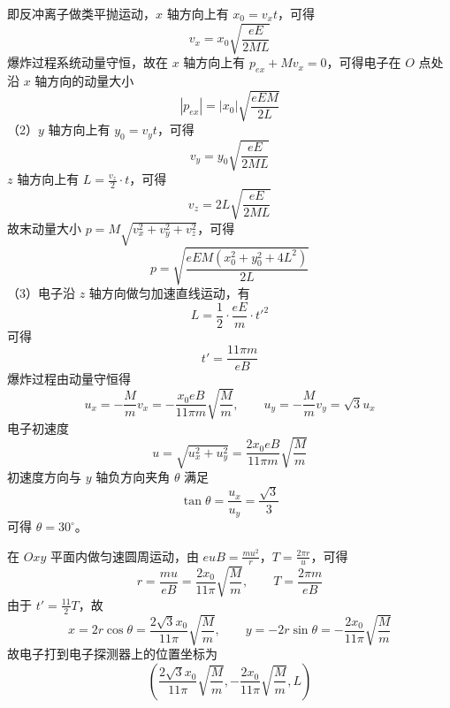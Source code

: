 \documentclass[\gkver]{gaokaozhenti}
\begin{document}
\begin{enumerate}
{即反冲离子做类平抛运动，$x$ 轴方向上有 $x_0=v_xt$，可得
\[
v_x=x_0\sqrt{\frac{eE}{2ML}}
\]
爆炸过程系统动量守恒，故在 $x$ 轴方向上有 $p_{ex}+Mv_x=0$，可得电子在 $O$ 点处沿 $x$ 轴方向的动量大小
\[
|p_{ex}|=|x_0|\sqrt{\frac{eEM}{2L}}
\]
（2）$y$ 轴方向上有 $y_0=v_yt$，可得
\[
v_y=y_0\sqrt{\frac{eE}{2ML}}
\]
$z$ 轴方向上有 $L=\frac{v_z}{2}\cdot t$，可得
\[
v_z=2L\sqrt{\frac{eE}{2ML}}
\]
故末动量大小 $p=M\sqrt{v_x^2+v_y^2+v_z^2}$，可得
\[
p=\sqrt{\frac{eEM(x_0^2+y_0^2+4L^2)}{2L}}
\]
（3）电子沿 $z$ 轴方向做匀加速直线运动，有
\[
L=\frac{1}{2}\cdot\frac{eE}{m}\cdot t'^2
\]
可得
\[
t'=\frac{11\pi m}{eB}
\]
爆炸过程由动量守恒得
\[
u_x=-\frac{M}{m}v_x=-\frac{x_0eB}{11\pi m}\sqrt{\frac{M}{m}},\qquad
u_y=-\frac{M}{m}v_y=\sqrt{3}u_x
\]
电子初速度
\[
u=\sqrt{u_x^2+u_y^2}=\frac{2x_0eB}{11\pi m}\sqrt{\frac{M}{m}}
\]
初速度方向与 $y$ 轴负方向夹角 $\theta$ 满足
\[
\tan\theta=\frac{u_x}{u_y}=\frac{\sqrt{3}}{3}
\]
可得 $\theta=30^\circ$。

在 $Oxy$ 平面内做匀速圆周运动，由 $euB=\frac{mu^2}{r}$，$T=\frac{2\pi r}{u}$，可得
\[
r=\frac{mu}{eB}=\frac{2x_0}{11\pi}\sqrt{\frac{M}{m}},\qquad
T=\frac{2\pi m}{eB}
\]
由于 $t'=\frac{11}{2}T$，故
\[
x=2r\cos\theta=\frac{2\sqrt{3}x_0}{11\pi}\sqrt{\frac{M}{m}},\qquad
y=-2r\sin\theta=-\frac{2x_0}{11\pi}\sqrt{\frac{M}{m}}
\]
故电子打到电子探测器上的位置坐标为
\[
\left(\frac{2\sqrt{3}x_0}{11\pi}\sqrt{\frac{M}{m}},-\frac{2x_0}{11\pi}\sqrt{\frac{M}{m}},L\right)
\]
}

\end{enumerate}
\end{document}
